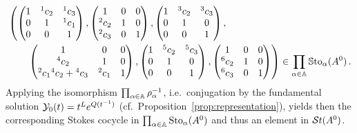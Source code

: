 \begin{align*}
  &\left(
    \begin{pmatrix} 1 & {}^1c_2 & {}^1c_3 \\0 & 1 & {}^1c_1 \\0 & 0 & 1 \end{pmatrix},
    \begin{pmatrix} 1 & 0 & 0 \\{}^2c_2 & 1 & 0 \\{}^2c_3 & 0 & 1 \end{pmatrix},
    \begin{pmatrix} 1 & {}^3c_2 & {}^3c_3 \\0 & 1 & 0 \\0 & 0 & 1 \end{pmatrix},
  \right.
\\&\qquad
  \left.
    \begin{pmatrix} 1 & 0 & 0 \\{}^4c_2 & 1 & 0 \\{}^2c_1{}^4c_2+{}^4c_3 & {}^2c_1 & 1 \end{pmatrix},
    \begin{pmatrix} 1 & {}^5c_2 & {}^5c_3 \\0 & 1 & 0 \\0 & 0 & 1 \end{pmatrix},
    \begin{pmatrix} 1 & 0 & 0 \\{}^{6}c_2 & 1 & 0 \\{}^{6}c_3 & 0 & 1 \end{pmatrix}
  \right)
  \in
  \prod_{\alpha\in\mathbb{A}}\operatorname{\mathbb{S}to}_{\alpha}(A^0) \,.
\end{align*}
Applying the isomorphism $\prod_{\alpha\in\mathbb{A}}\rho_\alpha^{-1}$, i.e.\
conjugation by the fundamental solution $\mathcal{Y}_0(t)=t^Le^{Q(t^{-1})}$
(cf.\ Proposition~\ref{prop:representation}), yields then the corresponding
Stokes cocycle in $\prod_{\alpha\in\mathbb{A}}\operatorname{Sto}_{\alpha}(A^0)$ and thus an element
in $\mathcal{S}{}t(A^0)$.
